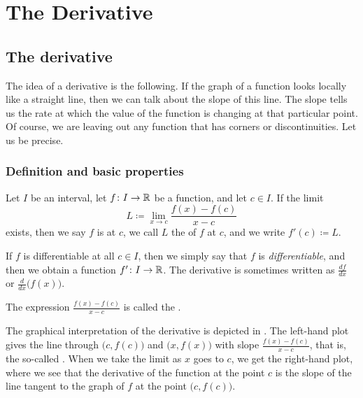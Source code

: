\chapter{The Derivative} \label{der:chapter}


\section{The derivative}
\label{sec:der}



The idea of a derivative is the following.
If the graph of a function looks locally like a straight line,
then we can talk about the slope of this line.
The slope tells us the rate at which 
the value of the function is changing at that particular point.
Of course, we are leaving out any function that has corners or
discontinuities.  
Let us be precise.

\subsection{Definition and basic properties}

\begin{defn}
Let $I$ be an interval, let
$f \colon I \to {\mathbb{R}}$ be a function, and let $c \in I$.  If 
the limit
\begin{equation*}
L \coloneqq \lim_{x \to c} \frac{f(x)-f(c)}{x-c} 
\end{equation*}
exists, then we say $f$ is
\emph{} at
$c$,  we call $L$ the \emph{} of $f$ at $c$,
and we write $f'(c) \coloneqq L$.

\medskip

If $f$ is differentiable at all $c \in I$, then we simply say that
$f$ is \emph{differentiable}, and then we obtain a function
$f' \colon I \to {\mathbb{R}}$.
The derivative is sometimes written as $\frac{df}{dx}$ or
$\frac{d}{dx}\bigl( f(x) \bigr)$.

\medskip

The expression $\frac{f(x)-f(c)}{x-c}$ is called the
\emph{}.
\end{defn}

The graphical interpretation of the derivative is  depicted in
.  The left-hand plot gives the line through
$\bigl(c,f(c)\bigr)$
and $\bigl(x,f(x)\bigr)$ with slope
$\frac{f(x)-f(c)}{x-c}$, that is,
the so-called \emph{}.  When we take the limit as $x$ goes to $c$,
we get the right-hand plot, where we see
that the derivative of the function
at the point $c$ is the slope of the line tangent to the graph of $f$
at the point $\bigl(c,f(c)\bigr)$.

